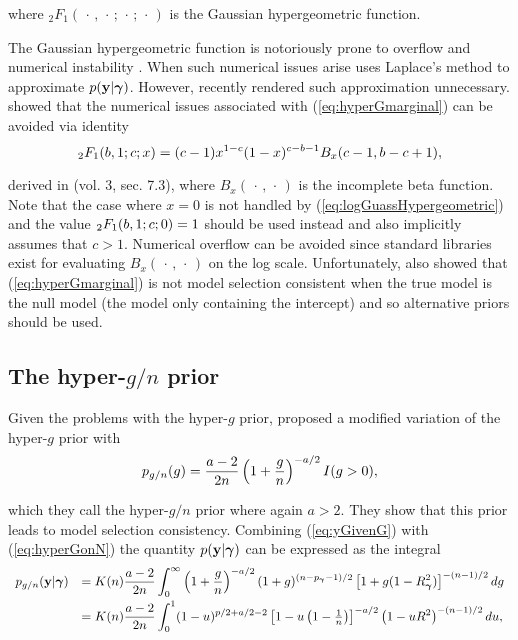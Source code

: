 \documentclass{article}[12pt]
\begin{document}
\noindent where ${}_2F_1(\,\cdot\,,\,\cdot\,;\,\cdot\,;\,\cdot\,)$ is the Gaussian hypergeometric function.

The Gaussian hypergeometric function is notoriously prone 
to overflow and numerical instability \citep{Pearson2017}. When such numerical issues arise 
\cite{Liang2008} uses Laplace's method to approximate $p({\bf y}|{\boldsymbol \gamma})$. 
However, recently \cite{Nadarajah2015}
rendered such approximation unnecessary.
\cite{Nadarajah2015} showed that the numerical issues associated with (\ref{eq:hyperGmarginal}) can be avoided 
via identity 
\begin{equation}\label{eq:logGuassHypergeometric}
\displaystyle {}_2F_1(b,1;c;x) = (c-1) x^{1-c} (1-x)^{c-b-1} B_x (c-1, b-c+1),
\end{equation}

\noindent derived in \cite{PrudnikovEtal1986} (vol. 3, sec. 7.3), where 
$B_x(\,\cdot\,,\,\cdot\,)$
is the incomplete beta function. Note that the case where $x=0$ is not handled by 
(\ref{eq:logGuassHypergeometric}) and the value $\displaystyle {}_2F_1(b,1;c;0) = 1$ should be used instead
and also implicitly assumes that $c>1$. Numerical overflow can be avoided
since standard libraries exist for evaluating $B_x(\,\cdot\,,\,\cdot\,)$
on the log scale.
Unfortunately, \cite{Liang2008} also showed that
(\ref{eq:hyperGmarginal}) is not model selection consistent when the
true model is the null model (the model only containing the intercept) and so alternative priors should be used.




\subsection{The hyper-$g/n$ prior}

Given the problems with the hyper-$g$ prior, \cite{Liang2008} 
proposed a modified variation of the hyper-$g$ prior with
\begin{equation}\label{eq:hyperGonN}
\displaystyle p_{g/n}(g) = \frac{a - 2}{2n}\left( 1 + \frac{g}{n} \right)^{-a/2}I(g>0),
\end{equation}

\noindent which they call the hyper-$g/n$ prior where again $a>2$.
They show that this prior leads to model selection consistency.
Combining (\ref{eq:yGivenG}) with (\ref{eq:hyperGonN}) the quantity $p({\bf y}|{\boldsymbol \gamma})$ 
can be expressed as the integral
\begin{equation}\label{eq:hyperGonNmarginalIntegral}
\begin{array}{rl}
p_{g/n}({\bf y}|{\boldsymbol \gamma}) 
& \displaystyle 
= K(n) \frac{a - 2}{2n}  \int_0^\infty 
\left( 1 + \frac{g}{n} \right)^{-a/2}
(1 + g)^{(n-p_{\boldsymbol \gamma}-1)/2} \left[ 1 + g (1 - R_{\boldsymbol \gamma}^2) \right]^{-(n-1)/2}  dg
\\ [2ex]
& \displaystyle = K(n) \frac{a - 2}{2n}  \int_0^1 
(1 - u)^{p/2 + a/2 - 2  } \left[ 1 - u \left(1  -  \tfrac{1}{n} \right) \right]^{-a/2} \left(  1 - u R^2\right)^{-(n-1)/2} du,
\end{array} 
\end{equation}
\end{document}

